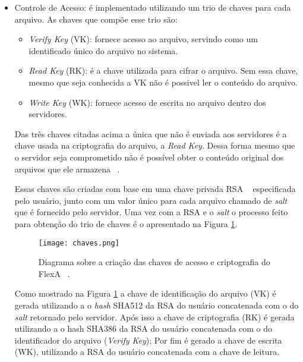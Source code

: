     	 \begin{itemize}
    	 
    	    \item Controle de Acesso: é implementado utilizando um trio de chaves para cada arquivo. As chaves que compõe esse trio são:
        	    \begin{itemize}
        	        \item \textit{Verify Key} (VK): fornece acesso ao arquivo, servindo como um identificado único do arquivo no sistema.
        	        \item \textit{Read Key} (RK): é a chave utilizada para cifrar o arquivo. Sem essa chave, mesmo que seja conhecida a VK não é possivel ler o conteúdo do arquivo.
        	        
        	        \item \textit{Write Key} (WK): fornece acesso de escrita no arquivo dentro dos servidores.
        	    \end{itemize}
        	    
            Das três chaves citadas acima a única que não é enviada aos servidores é a chave usada na criptografia do arquivo, a \textit{Read Key}. Dessa forma mesmo que o servidor seja comprometido não é possível obter o conteúdo original dos arquivos que ele armazena ~\cite{mario}.
        	    
        	    
        	    Essas chaves são criadas com base em uma chave privada RSA ~\cite{shamirRSA} especificada pelo usuário, junto com um valor único para cada arquivo chamado de \textit{salt} que é fornecido pelo servidor. Uma vez com a RSA e o \textit{\textit{salt}} o processo feito para obtenção do trio de chaves é o apresentado na Figura \ref{fig:chavesFlexa}.
        	    
        	    \begin{figure}[!ht]
        	    \centering
        	    \texttt{[image: chaves.png]}
        	    \caption{Diagrama sobre a criação das chaves de acesso e criptografia do FlexA ~\cite{mario}.}
        	    \label{fig:chavesFlexa}
        	    \end{figure}
        	    
        	    Como mostrado na Figura \ref{fig:chavesFlexa} a chave de identificação do arquivo (VK) é gerada utilizando a o \textit{hash} SHA512 da RSA do usuário concatenada com o do \textit{salt} retornado pelo servidor.
        	    Após isso a chave de criptografia (RK) é gerada utilizando a o hash SHA386 da RSA do usuário concatenada com o do identificador do arquivo (\textit{Verify Key});
        	    Por fim é gerado a chave de escrita (WK), utilizando a RSA do usuário concatenada com a chave de leitura.
        	    

\end{itemize}
